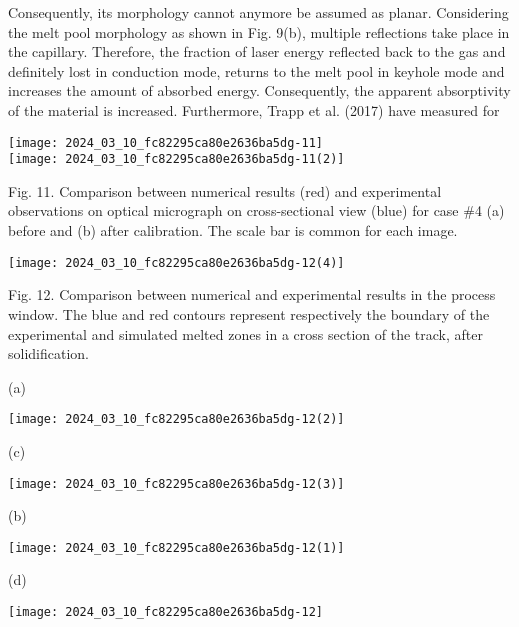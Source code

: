 \documentclass[10pt]{article}
\begin{document}
Consequently, its morphology cannot anymore be assumed as planar. Considering the melt pool morphology as shown in Fig. 9(b), multiple reflections take place in the capillary. Therefore, the fraction of laser energy reflected back to the gas and definitely lost in conduction mode, returns to the melt pool in keyhole mode and increases the amount of absorbed energy. Consequently, the apparent absorptivity of the material is increased. Furthermore, Trapp et al. (2017) have measured for

\texttt{[image: 2024\_03\_10\_fc82295ca80e2636ba5dg-11]}\\
\texttt{[image: 2024\_03\_10\_fc82295ca80e2636ba5dg-11(2)]}

Fig. 11. Comparison between numerical results (red) and experimental observations on optical micrograph on cross-sectional view (blue) for case \#4 (a) before and (b) after calibration. The scale bar is common for each image.

\begin{center}
\texttt{[image: 2024\_03\_10\_fc82295ca80e2636ba5dg-12(4)]}
\end{center}

Fig. 12. Comparison between numerical and experimental results in the process window. The blue and red contours represent respectively the boundary of the experimental and simulated melted zones in a cross section of the track, after solidification.

(a)

\begin{center}
\texttt{[image: 2024\_03\_10\_fc82295ca80e2636ba5dg-12(2)]}
\end{center}

(c)

\begin{center}
\texttt{[image: 2024\_03\_10\_fc82295ca80e2636ba5dg-12(3)]}
\end{center}

(b)

\begin{center}
\texttt{[image: 2024\_03\_10\_fc82295ca80e2636ba5dg-12(1)]}
\end{center}

(d)

\begin{center}
\texttt{[image: 2024\_03\_10\_fc82295ca80e2636ba5dg-12]}
\end{center}
\end{document}
